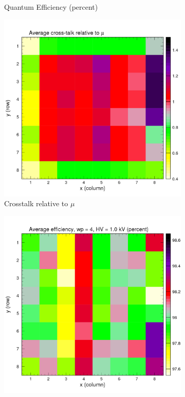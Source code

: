 \begin{figure}[t!]
\begin{subfigure}[c]{0.48\linewidth}
		\caption{Quantum Efficiency (percent)}
		\vspace{0mm}
	\end{subfigure}%
	\vspace{3mm}
	\begin{subfigure}[c]{0.48\linewidth}
		\centering
		\includegraphics[width=\linewidth]{figures/pglobal_beta_r.pdf}
		\caption{Crosstalk relative to $\mu$}
		\vspace{0mm}
	\end{subfigure}%
	\begin{subfigure}[c]{0.48\linewidth}
		\centering
		\includegraphics[width=\linewidth]{figures/pglobal_eff2d_r4.pdf}

\end{subfigure}
\end{figure}
